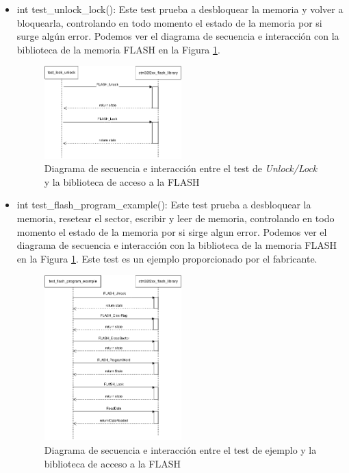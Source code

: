 \begin{itemize}
\item int test\_unlock\_lock(): Este test prueba a desbloquear la memoria y volver a bloquearla, controlando en todo momento el estado de la memoria por si surge algún error. Podemos ver el diagrama de secuencia e interacción con la biblioteca de la memoria FLASH en la Figura \ref{fig:testLockUnlock}.

\begin{figure}[!h]
\begin{center}
\includegraphics[width=0.5\textwidth]{figs/testLockUnlock.png}
\caption{Diagrama de secuencia e interacción entre el test de \textit{Unlock/Lock} y la biblioteca de acceso a la FLASH}
\label{fig:testLockUnlock}
\end{center}
\end{figure}

\item int test\_flash\_program\_example(): Este test prueba a desbloquear la memoria, resetear el sector, escribir y leer de memoria, controlando en todo momento el estado de la memoria por si sirge algun error. Podemos ver el diagrama de secuencia e interacción con la biblioteca de la memoria FLASH en la Figura \ref{fig:testLockUnlock}. Este test es un ejemplo proporcionado por el fabricante.

\begin{figure}[!h]
\begin{center}
\includegraphics[width=0.5\textwidth]{figs/test_flash_program_example.png}
\caption{Diagrama de secuencia e interacción entre el test de ejemplo  y la biblioteca de acceso a la FLASH}
\label{fig:test_flash_program_example}
\end{center}
\end{figure}


\end{itemize}
